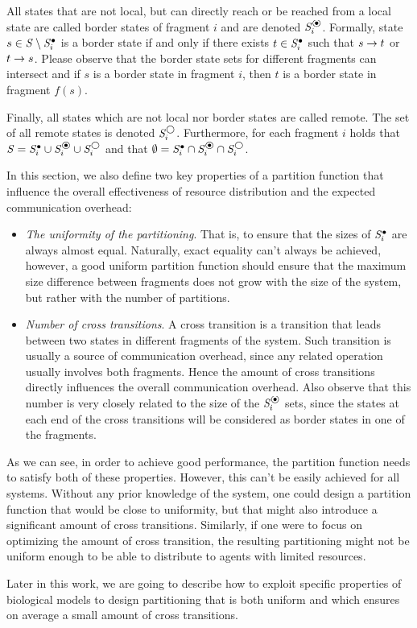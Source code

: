All states that are not local, but can directly reach or be reached from a local state are called border states of fragment $i$ and are denoted $\dtsSborder_i$. Formally, state $s \in \mathit{S} \setminus \mathit{S}^\bullet_i$ is a border state if and only if there exists $t \in \mathit{S}^\bullet_i$ such that $s \rightarrow t$ or $t \rightarrow s$. Please observe that the border state sets for different fragments can intersect and if $s$ is a border state in fragment $i$, then $t$ is a border state in fragment $f(s)$.

Finally, all states which are not local nor border states are called remote. The set of all remote states is denoted $\mathit{S}^\bigcirc_i$. Furthermore, for each fragment $i$ holds that $\dtsS = \dtsSlocal_i \cup \dtsSborder_i \cup \dtsSremote_i$ and that $\emptyset = \dtsSlocal_i \cap \dtsSborder_i \cap \dtsSremote_i$.

In this section, we also define two key properties of a partition function that influence the overall effectiveness of resource distribution and the expected communication overhead:

\begin{itemize}
	\item  \emph{The uniformity of the partitioning}. That is, to ensure that the sizes of $\mathit{S}^\bullet_i$ are always almost equal. Naturally, exact equality can't always be achieved, however, a good uniform partition function should ensure that the maximum size difference between fragments does not grow with the size of the system, but rather with the number of partitions.
	\item \emph{Number of cross transitions}. A cross transition is a transition that leads between two states in different fragments of the system. Such transition is usually a source of communication overhead, since any related operation usually involves both fragments. Hence the amount of cross transitions directly influences the overall communication overhead. Also observe that this number is very closely related to the size of the $\dtsSborder_i$ sets, since the states at each end of the cross transitions will be considered as border states in one of the fragments.
\end{itemize}

As we can see, in order to achieve good performance, the partition function needs to satisfy both of these properties. However, this can't be easily achieved for all systems. Without any prior knowledge of the system, one could design a partition function that would be close to uniformity, but that might also introduce a significant amount of cross transitions. Similarly, if one were to focus on optimizing the amount of cross transition, the resulting partitioning might not be uniform enough to be able to distribute to agents with limited resources.

Later in this work, we are going to describe how to exploit specific properties of biological models to design partitioning that is both uniform and which ensures on average a small amount of cross transitions.